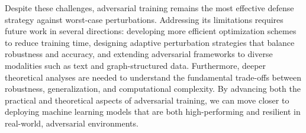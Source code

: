 \documentclass[10pt,twocolumn,letterpaper]{article}
\begin{document}
Despite these challenges, adversarial training remains the most effective defense strategy against worst-case perturbations. Addressing its limitations requires future work in several directions: developing more efficient optimization schemes to reduce training time, designing adaptive perturbation strategies that balance robustness and accuracy, and extending adversarial frameworks to diverse modalities such as text and graph-structured data. Furthermore, deeper theoretical analyses are needed to understand the fundamental trade-offs between robustness, generalization, and computational complexity. By advancing both the practical and theoretical aspects of adversarial training, we can move closer to deploying machine learning models that are both high-performing and resilient in real-world, adversarial environments.

{\small


}
\end{document}
